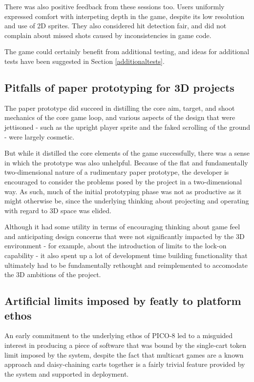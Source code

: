 \documentclass[11pt]{article}
\begin{document}
There was also positive feedback from these sessions too. Users uniformly expressed comfort with
interpeting depth in the game, despite its low resolution and use of 2D sprites. They also
considered hit detection fair, and did not complain about missed shots caused by inconsistencies
in game code.

The game could certainly benefit from additional testing, and ideas for additional
tests have been suggested in Section \ref{additionaltests}.

\subsection{Pitfalls of paper prototyping for 3D projects}\label{prototypepitfalls}

The paper prototype did succeed in distilling the core aim, target, and shoot mechanics
of the core game loop, and various aspects of the design that were jettisoned - such as
the upright player sprite and the faked scrolling of the ground - were largely cosmetic.

But while it distilled the core elements of the game successfully, there was a sense in
which the prototype was also unhelpful. Because of the flat and fundamentally two-dimensional
nature of a rudimentary paper prototype, the developer is encouraged to consider the
problems posed by the project in a two-dimensional way. As such, much of the initial prototyping
phase was not as productive as it might otherwise be, since the underlying thinking about
projecting and operating with regard to 3D space was elided.

Although it had some utility in terms of encouraging thinking about game feel and anticipating
design concerns that were not significantly impacted by the 3D environment - for example, about
the introduction of limits to the lock-on capability - it also spent up a lot of development time
building functionality that ultimately had to be fundamentally rethought and reimplemented to
accomodate the 3D ambitions of the project.

\subsection{Artificial limits imposed by featly to platform ethos}

An early commitment to the underlying ethos of PICO-8 led to a misguided interest in producing
a piece of software that was bound by the single-cart token limit imposed by the system, despite
the fact that multicart games are a known approach and daisy-chaining carts together is a fairly
trivial feature provided by the system and supported in deployment.
\end{document}

